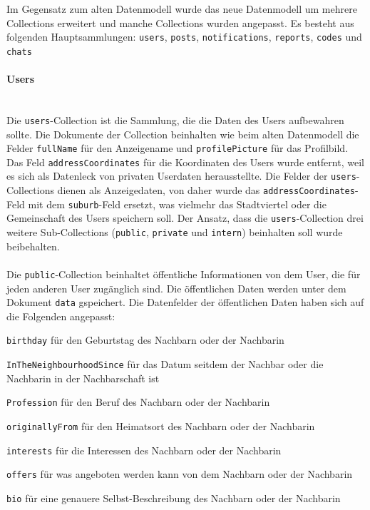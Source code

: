 Im Gegensatz zum alten Datenmodell wurde das neue Datenmodell um mehrere Collections erweitert und manche Collections wurden angepasst. Es besteht aus folgenden Hauptsammlungen: \texttt{users}, \texttt{posts}, \texttt{notifications}, \texttt{reports}, \texttt{codes} und \texttt{chats}

\paragraph{Users}\mbox{} \\
Die \texttt{users}-Collection ist die Sammlung, die die Daten des Users aufbewahren sollte. Die Dokumente der Collection beinhalten wie beim alten Datenmodell die Felder \texttt{fullName} für den Anzeigename und \texttt{profilePicture} für das Profilbild. Das Feld \texttt{addressCoordinates} für die Koordinaten des Users wurde entfernt, weil es sich als Datenleck von privaten Userdaten herausstellte. Die Felder der \texttt{users}-Collections dienen als Anzeigedaten, von daher wurde das \texttt{addressCoordinates}-Feld mit dem \texttt{suburb}-Feld ersetzt, was vielmehr das Stadtviertel oder die Gemeinschaft des Users speichern soll.
Der Ansatz, dass die \texttt{users}-Collection drei weitere Sub-Collections (\texttt{public}, \texttt{private} und \texttt{intern}) beinhalten soll wurde beibehalten.
\\\\
Die \texttt{public}-Collection beinhaltet öffentliche Informationen von dem User, die für jeden anderen User zugänglich sind. Die öffentlichen Daten werden unter dem Dokument \texttt{data} gspeichert. Die Datenfelder der öffentlichen Daten haben sich auf die Folgenden angepasst:
\begin{compactitem}
  \item \texttt{birthday} für den Geburtstag des Nachbarn oder der Nachbarin
  \item \texttt{InTheNeighbourhoodSince} für das Datum seitdem der Nachbar oder die Nachbarin in der Nachbarschaft ist
  \item \texttt{Profession} für den Beruf des Nachbarn oder der Nachbarin
  \item \texttt{originallyFrom} für den Heimatsort des Nachbarn oder der Nachbarin
  \item \texttt{interests} für die Interessen des Nachbarn oder der Nachbarin
  \item \texttt{offers} für was angeboten werden kann von dem Nachbarn oder der Nachbarin
  \item \texttt{bio} für eine genauere Selbst-Beschreibung des Nachbarn oder der Nachbarin
\end{compactitem}

